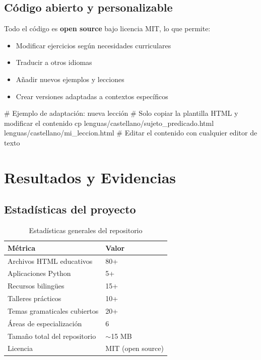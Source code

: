\documentclass[12pt,spanish]{article}
\begin{document}
\subsection{Código abierto y personalizable}

Todo el código es \textbf{open source} bajo licencia MIT, lo que permite:

\begin{itemize}
    \item Modificar ejercicios según necesidades curriculares
    \item Traducir a otros idiomas
    \item Añadir nuevos ejemplos y lecciones
    \item Crear versiones adaptadas a contextos específicos
\end{itemize}

\begin{codigo}
# Ejemplo de adaptación: nueva lección
# Solo copiar la plantilla HTML y modificar el contenido
cp lenguas/castellano/sujeto_predicado.html lenguas/castellano/mi_leccion.html
# Editar el contenido con cualquier editor de texto
\end{codigo}

\section{Resultados y Evidencias}

\subsection{Estadísticas del proyecto}

\begin{table}[H]
\centering
\caption{Estadísticas generales del repositorio}
\label{tab:estadisticas}
\begin{tabular}{|p{6cm}|p{4cm}|}
\hline
\textbf{Métrica} & \textbf{Valor} \\
\hline
Archivos HTML educativos & 80+ \\
\hline
Aplicaciones Python & 5+ \\
\hline
Recursos bilingües & 15+ \\
\hline
Talleres prácticos & 10+ \\
\hline
Temas gramaticales cubiertos & 20+ \\
\hline
Áreas de especialización & 6 \\
\hline
Tamaño total del repositorio & $\sim$15 MB \\
\hline
Licencia & MIT (open source) \\
\hline
\end{tabular}
\end{table}
\end{document}
